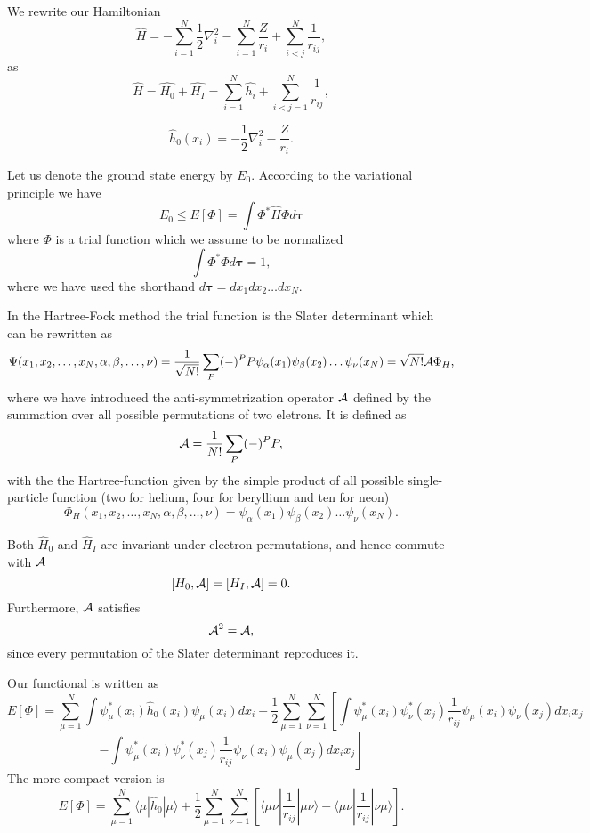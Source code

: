 We rewrite our Hamiltonian 
\[
  \hat{H} = -\sum_{i=1}^N \frac{1}{2} \nabla^2_i 
  - \sum_{i=1}^N \frac{Z}{r_i} + \sum_{i<j}^N \frac{1}{r_{ij}},
\]
as
\[
    \hat{H} = \hat{H_0} + \hat{H_I} 
    = \sum_{i=1}^N\hat{h_i} + \sum_{i<j=1}^N\frac{1}{r_{ij}},
\]

\[
  \hat{h}_0(x_i) = - \frac{1}{2} \nabla^2_i - \frac{Z}{r_i}.
\]

Let us denote the ground state energy by $E_0$. According to the
variational principle we have
\begin{equation*}
  E_0 \le E[\Phi] = \int \Phi^*\hat{H}\Phi d\mathbf{\tau}
\end{equation*}
where $\Phi$ is a trial function which we assume to be normalized
\begin{equation*}
  \int \Phi^*\Phi d\mathbf{\tau} = 1,
\end{equation*}
where we have used the shorthand $d\mathbf{\tau}=dx_1dx_2\dots dx_N$.

In the Hartree-Fock method the trial function is the Slater
determinant which can be rewritten as 
\[
  \Psi(x_1,x_2,\dots,x_N,\alpha,\beta,\dots,\nu) = \frac{1}{\sqrt{N!}}\sum_{P} (-)^PP\psi_{\alpha}(x_1)
    \psi_{\beta}(x_2)\dots\psi_{\nu}(x_N)=\sqrt{N!}{\cal A}\Phi_H,
\]
where we have introduced the anti-symmetrization operator ${\cal A}$ defined by the 
summation over all possible permutations of two eletrons.
It is defined as
\[
  {\cal A} = \frac{1}{N!}\sum_{P} (-)^PP,
\]
with the the Hartree-function given by the simple product of all possible single-particle function (two for helium, four for beryllium and ten for
neon)
\[
  \Phi_H(x_1,x_2,\dots,x_N,\alpha,\beta,\dots,\nu) =
  \psi_{\alpha}(x_1)
    \psi_{\beta}(x_2)\dots\psi_{\nu}(x_N).
\]


Both $\hat{H}_0$ and $\hat{H}_I$ are invariant under electron
permutations, and hence commute with ${\cal A}$
\[
  [H_0,{\cal A}] = [H_I,{\cal A}] = 0.
\]
Furthermore, ${\cal A}$ satisfies
\[
  {\cal A}^2 = {\cal A},
\]
since every permutation of the Slater
determinant reproduces it.

Our functional is written as 
\[
  E[\Phi] = \sum_{\mu=1}^N \int \psi_{\mu}^*(x_i)\hat{h}_0(x_i)\psi_{\mu}(x_i) dx_i 
  + \frac{1}{2}\sum_{\mu=1}^N\sum_{\nu=1}^N
   \left[ \int \psi_{\mu}^*(x_i)\psi_{\nu}^*(x_j)\frac{1} 
    {r_{ij}}\psi_{\mu}(x_i)\psi_{\nu}(x_j)
    dx_ix_j \right.
\]
\[ \left.
  - \int \psi_{\mu}^*(x_i)\psi_{\nu}^*(x_j)
  \frac{1}{r_{ij}}\psi_{\nu}(x_i)\psi_{\mu}(x_j)
  dx_ix_j\right]
\]
The more compact version is
\[
  E[\Phi] 
  = \sum_{\mu=1}^N \langle \mu | \hat{h}_0 | \mu\rangle+ \frac{1}{2}\sum_{\mu=1}^N\sum_{\nu=1}^N\left[\langle \mu\nu |\frac{1}{r_{ij}}|\mu\nu\rangle-\langle \mu\nu |\frac{1}{r_{ij}}|\nu\mu\rangle\right].
\]


